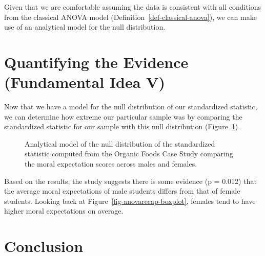 \documentclass[
  letterpaper,
  DIV=11,
  numbers=noendperiod]{scrreprt}
\theoremstyle{definition}
\theoremstyle{definition}
\theoremstyle{plain}
\theoremstyle{remark}
\begin{document}
Given that we are comfortable assuming the data is consistent with all
conditions from the classical ANOVA model
(Definition~\ref{def-classical-anova}), we can make use of an analytical
model for the null distribution.

\section{Quantifying the Evidence (Fundamental Idea
V)}\label{quantifying-the-evidence-fundamental-idea-v-1}

Now that we have a model for the null distribution of our standardized
statistic, we can determine how extreme our particular sample was by
comparing the standardized statistic for our sample with this null
distribution (Figure~\ref{fig-anovarecap-null-distribution}).

\begin{figure}


\caption{\label{fig-anovarecap-null-distribution}Analytical model of the
null distribution of the standardized statistic computed from the
Organic Foods Case Study comparing the moral expectation scores across
males and females.}

\end{figure}%

Based on the results, the study suggests there is some evidence (p =
0.012) that the average moral expectations of male students differs from
that of female students. Looking back at
Figure~\ref{fig-anovarecap-boxplot}, females tend to have higher moral
expectations on average.

\section{Conclusion}\label{conclusion}
\end{document}
